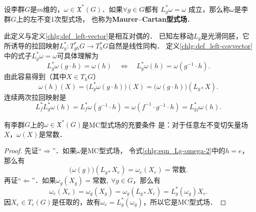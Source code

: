 \begin{definition}\label{chlg:def_left-covvector}
    设李群$G$是$m$维的，$\omega\in \mathfrak{X}^*(G)$．如果$\forall g\in G$都有
    $  L_g^* \omega = \omega $
    成立，那么称$\omega$是李群$G$上的{\heiti 左不变1次型式场}，
    也称为{\heiti \bfseries Maurer--Cartan型式场}．
\end{definition}
此定义与定义\ref{chlg:def_left-vector}是相互对偶的．
已知左移动$L_g$是光滑同胚，它所诱导的拉回映射$L_g^*:T^*_{gh}G \to T^*_hG$自然是线性同构．
定义\eqref{chlg:def_left-covvector}中的式子$  L_g^* \omega = \omega $可具体理解为
\begin{equation}\label{chlg:eqn_Lg-omega-1}
    L_g^* \omega(g\cdot h)= \omega(h) \quad \Leftrightarrow\quad
    L_g^* \omega(h)= \omega(g^{-1}\cdot h).
\end{equation}
由此容易得到（其中$X\in T_h G$）
\begin{equation}\label{chlg:eqn_Lg-omega-2}
    \omega(h) (X)=\bigl(L_g^* \omega(g\cdot h)\bigr) (X)
    =\bigl(\omega(g\cdot h)\bigr)(L_{g*}X) .
\end{equation}
连续两次拉回映射是
\begin{equation}\label{chlg:eqn_Lg-omega-3}
    L_f^* L_g^* \omega(h)=L_f^* \omega(g^{-1}\cdot h)=\omega(f^{-1}\cdot g^{-1}\cdot h)
    =L_{gf}^* \omega(h).
\end{equation}




\begin{theorem}\label{chlg:thm_left-1form}
    有李群$G$上的$\omega\in \mathfrak{X}^*(G)$是MC型式场的充要条件
    是：对于任意左不变切矢量场$X$，$\omega(X)$是常数．
\end{theorem}
\begin{proof}
    先证“$\Rightarrow$”．如果$\omega$是MC型式场，
    令式\eqref{chlg:eqn_Lg-omega-2}中的$h=e$，那么有
    \begin{equation}
        \bigl(\omega(g)\bigr)(L_{g*}X_e)=\omega_e (X_e)=\text{常数}.
    \end{equation}
    再证“$\Leftarrow$”．如果$\omega_g (X_g)=\text{常数},\ \forall g\in G$，那么有
    \begin{equation}
        \omega_e (X_e) = \omega_g (X_g) =\omega_g (L_{g*}X_e) = L_g^* (\omega_g) X_e. 
    \end{equation}
    因$X_e\in T_e(G)$是任取的，故有$\omega_e=L_g^* (\omega_g)$，所以它是MC型式场．
\end{proof}



